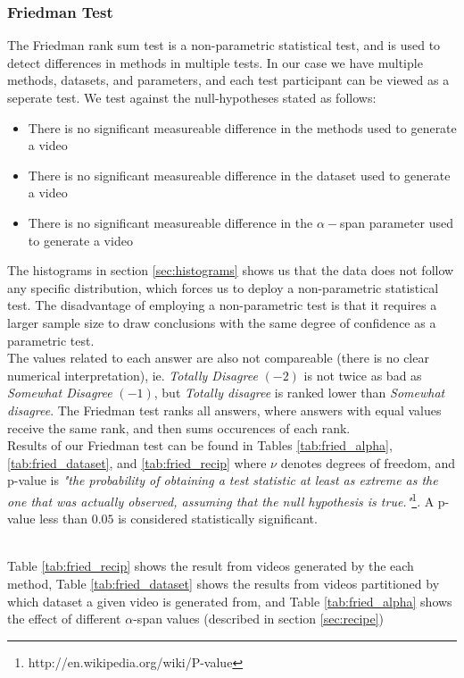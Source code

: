 \subsubsection{Friedman Test}\label{sec:friedman}
%
The Friedman rank sum test is a non-parametric statistical test, and is used to detect differences in methods in multiple tests. In our case we have multiple methods, datasets, and parameters, and each test participant can be viewed as a seperate test. We test against the null-hypotheses stated as follows: 
%
\begin{itemize}
\item There is no significant measureable difference in the methods used to generate a video
\item There is no significant measureable difference in the dataset used to generate a video
\item There is no significant measureable difference in the $\alpha-$span parameter used to generate a video
\end{itemize}
%
The histograms in section \ref{sec:histograms} shows us that the data does not follow any specific distribution, which forces us to deploy a non-parametric statistical test. The disadvantage of employing a non-parametric test is that it requires a larger sample size to draw conclusions with the same degree of confidence as a parametric test.\\
%
The values related to each answer are also not compareable (there is no clear numerical interpretation), ie. \textit{Totally Disagree} $(-2)$ is not twice as bad as \textit{Somewhat Disagree} $(-1)$, but \textit{Totally disagree} is ranked lower than \textit{Somewhat disagree}. The Friedman test ranks all answers, where answers with equal values receive the same rank, and then sums occurences of each rank.\\
%
Results of our Friedman test can be found in Tables \ref{tab:fried_alpha}, \ref{tab:fried_dataset}, and \ref{tab:fried_recip} where $\nu$ denotes degrees of freedom, and p-value is \textit{"the probability of obtaining a test statistic at least as extreme as the one that was actually observed, assuming that the null hypothesis is true."}\footnote{http://en.wikipedia.org/wiki/P-value}. A p-value less than $0.05$ is considered statistically significant.



\\
Table \ref{tab:fried_recip} shows the result from videos generated by the each method, Table \ref{tab:fried_dataset} shows the results from videos partitioned by which dataset a given video is generated from, and Table \ref{tab:fried_alpha} shows the effect of different $\alpha$-span values (described in section \ref{sec:recipe})
%
